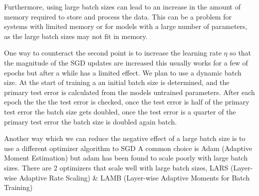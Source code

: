\documentclass[11pt]{article}
\begin{document}
Furthermore, using large batch sizes can lead to an increase in the amount of memory required to store and process the data. This can be a problem for systems with limited memory or for models with a large number of parameters, as the large batch sizes may not fit in memory.

One way to counteract the second point is to increase the learning rate $\eta$ so that the magnitude of the SGD updates are increased this usually works for a few of epochs but after a while has a limited effect. We plan to use a dynamic batch size. At the start of training a an initial batch size is determined, and the primary test error is calculated from the models untrained parameters. After each epoch the the the test error is checked, once the test error is half of the primary test error the batch size gets doubled, once the test error is a quarter of the primary test error the batch size is doubled again batch.

Another way which we can reduce the negative effect of a large batch size is to use a different optimizer algorithm to SGD A common choice is Adam (Adaptive Moment Estimation) but adam has been found to scale poorly with large batch sizes. There are 2 optimizers that scale well with large batch sizes, LARS (Layer-wise Adaptive Rate Scaling) \& LAMB (Layer-wise Adaptive Moments for Batch Training)

\end{document}
